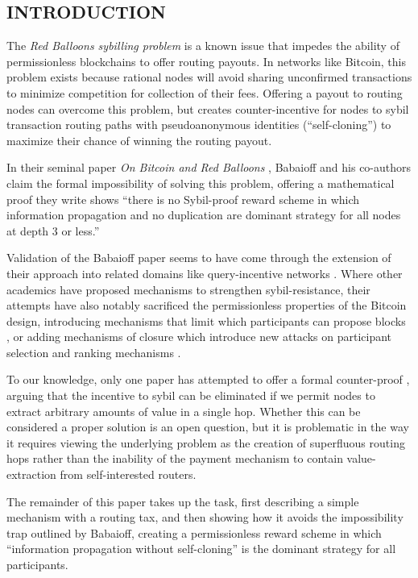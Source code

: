 \documentclass[oneside]{article}   	%
\begin{document}
\begin{multicols}{2}

\subsection*{INTRODUCTION}

The \textit{Red Balloons sybilling problem} is a known issue that impedes the ability of permissionless blockchains to offer routing payouts. In networks like Bitcoin, this problem exists because rational nodes will avoid sharing unconfirmed transactions to minimize competition for collection of their fees. Offering a payout to routing nodes can overcome this problem, but creates counter-incentive for nodes to sybil transaction routing paths with pseudoanonymous identities (``self-cloning'') to maximize their chance of winning the routing payout.

In their seminal paper \textit{On Bitcoin and Red Balloons} \cite{Babaioff2011OnBA}, Babaioff and his co-authors claim the formal impossibility of solving this problem, offering a mathematical proof they write shows ``there is no Sybil-proof reward scheme in which information propagation and no duplication are dominant strategy for all nodes at depth 3 or less.''

Validation of the Babaioff paper seems to have come through the extension of their approach into related domains like query-incentive networks \cite{chen2013sybil} \cite{zhang2023collusionproof}. Where other academics have proposed mechanisms to strengthen sybil-resistance, their attempts have also notably sacrificed the permissionless properties of the Bitcoin design, introducing mechanisms that limit which participants can propose blocks \cite{DBLP:journals/corr/abs-1712-07564}, or adding mechanisms of closure which introduce new attacks on participant selection and ranking mechanisms \cite{DBLP:journals/corr/AbrahamMNRS16}.

To our knowledge, only one paper has attempted to offer a formal counter-proof \cite{DBLP:journals/corr/abs-2110-10606}, arguing that the incentive to sybil can be eliminated if we permit nodes to extract arbitrary amounts of value in a single hop. Whether this can be considered a proper solution is an open question, but it is problematic in the way it requires viewing the underlying problem as the creation of superfluous routing hops rather than the inability of the payment mechanism to contain value-extraction from self-interested routers.

The remainder of this paper takes up the task, first describing a simple mechanism with a routing tax, and then showing how it avoids the impossibility trap outlined by Babaioff, creating a permissionless reward scheme in which ``information propagation without self-cloning'' is the dominant strategy for all participants.


\end{multicols}
\end{document}
